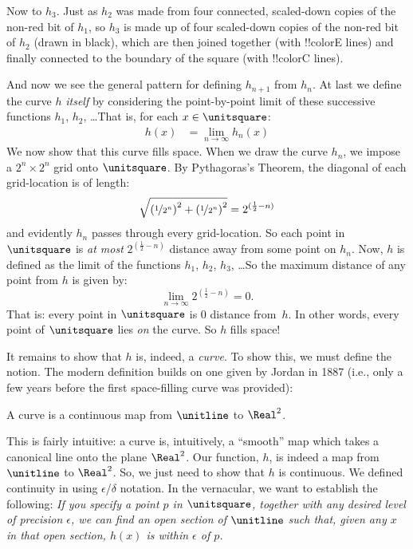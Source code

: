 \documentclass[../../../include/open-logic-section]{subfiles}
\begin{document}
Now to $h_3$. Just as $h_2$ was made from four connected, scaled-down copies of the non-red bit of $h_1$, so $h_3$ is made up of four scaled-down copies of the non-red bit of $h_2$ (drawn in black), which are then joined together (with !!{colorE} lines) and finally connected to the boundary of the square (with !!{colorC} lines).
\begin{center}
\end{center}
And now we see the general pattern for defining $h_{n+1}$ from $h_n$.
At last we define the curve $h$ \emph{itself} by considering the
point-by-point limit of these successive functions $h_1$, $h_2$,
\dots\@ That is, for each $x \in \unitsquare$:
\begin{align*}
	h(x) &= \lim_{n \rightarrow \infty} h_n(x)
\end{align*} 
We now show that this curve fills space. When we draw the curve $h_n$,
we impose a $2^n \times 2^n$ grid onto $\unitsquare$. By Pythagoras's
Theorem, the diagonal of each grid-location is of length:
\[
\sqrt{\left(\nicefrac{1}{2^{n}}\right)^2+\left(\nicefrac{1}{2^{n}}\right)^2} = 2^{(\frac{1}{2}-n)}
\]
and evidently $h_n$ passes through every grid-location. So each point
in $\unitsquare$ is \emph{at most} $2^{(\frac{1}{2}-n)}$ distance away
from some point on $h_n$. Now, $h$ is defined as the limit of the
functions $h_1$, $h_2$, $h_3$, \dots\@ So the maximum distance of any
point from $h$ is given by:
\[
\lim_{n \rightarrow \infty} 2^{(\frac{1}{2}-n)} = 0.
\]
That is: every point in $\unitsquare$ is $0$ distance from~$h$. In
other words, every point of $\unitsquare$ lies \emph{on} the curve. So $h$
fills space!{}

It remains to show that $h$ is, indeed, a \emph{curve}. To show this,
we must define the notion. The modern definition builds on one given
by Jordan in 1887 (i.e., only a few years before the first
space-filling curve was provided): 

\begin{defn}
A curve is a continuous map from $\unitline$ to $\Real^2$. 
\end{defn}

This is fairly intuitive: a curve is, intuitively, a ``smooth'' map
which takes a canonical line onto the plane $\Real^2$. Our function,
$h$, is indeed a map from $\unitline$ to $\Real^2$. So, we just need
to show that $h$ is continuous. We defined continuity in
 using $\epsilon$/$\delta$ notation. In the
vernacular, we want to establish the following: \emph{If you specify a
point $p$ in $\unitsquare$, together with any desired level of
precision $\epsilon$, we can find an open section of $\unitline$ such
that, given any $x$ in that open section, $h(x)$ is within $\epsilon$
of $p$.}
\end{document}
